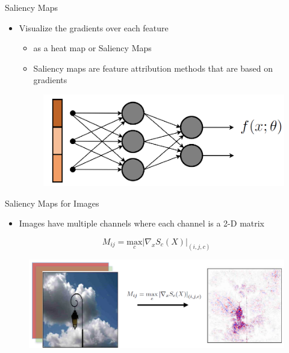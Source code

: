 \documentclass[11pt,compress,t,notes=noshow, aspectratio=169, xcolor=table]{beamer}
\begin{document}
\begin{frame}{Saliency Maps}
\begin{itemize}
    \item Visualize the gradients over each feature
    \begin{itemize}
        \item as a heat map or Saliency Maps %
        \item Saliency maps are feature attribution methods that are based on gradients
    \end{itemize}
    \bigskip
    \begin{figure}
        \includegraphics[scale=.5]{bild15}
    \end{figure}
\end{itemize}

\end{frame}

\begin{frame}{Saliency Maps for Images}
    \begin{itemize}
        \item Images have multiple channels where each channel is a 2-D matrix
    \end{itemize}
    \begin{equation*}
        M_{ij} = \underset{c}{\text{max}}\left|\nabla_xS_c(X) \right|_{(i,j,c)}
    \end{equation*}
    \begin{figure}
        \centering
        \includegraphics[scale=.45]{bild16n}
    \end{figure}
\end{frame}
\end{document}
